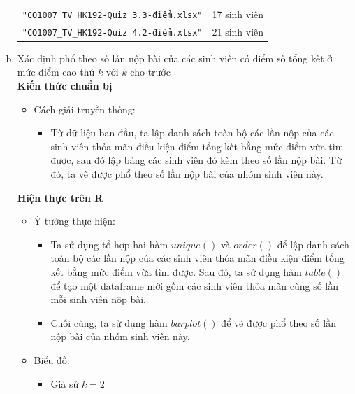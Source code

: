 \documentclass[a4paper]{article}
\theoremstyle{definition}
\begin{document}
\begin{enumerate}[a)]
{\begin{itemize}
\begin{itemize}
\begin{center}
\begin{tabular}{l c}
                     \texttt{"CO1007\_TV\_HK192-Quiz 3.3-điểm.xlsx"} & 17 sinh viên\\
                     \texttt{"CO1007\_TV\_HK192-Quiz 4.2-điểm.xlsx"} & 21 sinh viên
                \end{tabular}
            \end{center}
        \end{itemize}
    \end{itemize}}
    \bf\item {Xác định phổ theo số lần nộp bài của các sinh viên có điểm số tổng kết ở mức điểm cao thứ $k$ với $k$ cho trước}\\[6pt]
    \bf Kiến thức chuẩn bị\normalfont
    \begin{itemize}
        \item Cách giải truyền thống:
        \begin{itemize}
            \item Từ dữ liệu ban đầu, ta lập danh sách toàn bộ các lần nộp của các sinh viên thỏa mãn điều kiện điểm tổng kết bằng mức điểm vừa tìm được, sau đó lập bảng các sinh viên đó kèm theo số lần nộp bài. Từ đó, ta vẽ được phổ theo số lần nộp bài của nhóm sinh viên này.
        \end{itemize}
    \end{itemize}
    \bf Hiện thực trên R\normalfont
    \begin{itemize}
        \item Ý tưởng thực hiện:
        \begin{itemize}
            \item Ta sử dụng tổ hợp hai hàm $unique()$ và $order()$ để lập danh sách toàn bộ các lần nộp của các sinh viên thỏa mãn điều kiện điểm tổng kết bằng mức điểm vừa tìm được. Sau đó, ta sử dụng hàm $table()$ để tạo một dataframe mới gồm các sinh viên thỏa mãn cùng số lần mỗi sinh viên nộp bài.
            \item Cuối cùng, ta sử dụng hàm $barplot()$ để vẽ được phổ theo số lần nộp bài của nhóm sinh viên này.
        \end{itemize}
        \item Biểu đồ:
        \begin{center}
            \begin{itemize}
                \item Giả sử $k = 2$
            \end{itemize}
            \begin{tabular}{c c}

\end{tabular}
\end{center}
\end{itemize}
\end{enumerate}
\end{document}
